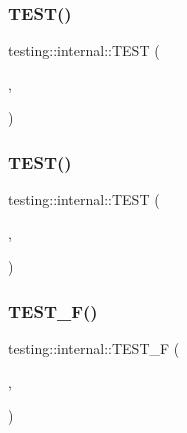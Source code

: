 \mbox{\label{namespacetesting_1_1internal_a0e7c2d58a313bec0821df19f44351d84}} 
\subsubsection{\texorpdfstring{TEST()}{TEST()}\hspace{0.1cm}{\footnotesize\ttfamily [40/41]}}
{\footnotesize\ttfamily testing\+::internal\+::\+T\+E\+ST (\begin{DoxyParamCaption}\item[{Thread\+Local\+Test}]{,  }\item[{Get\+And\+Pointer\+Return\+Same\+Value}]{ }\end{DoxyParamCaption})}

\mbox{\label{namespacetesting_1_1internal_aaed45d6ba960f02e8d3d042c606bc98e}} 
\subsubsection{\texorpdfstring{TEST()}{TEST()}\hspace{0.1cm}{\footnotesize\ttfamily [41/41]}}
{\footnotesize\ttfamily testing\+::internal\+::\+T\+E\+ST (\begin{DoxyParamCaption}\item[{Thread\+Local\+Test}]{,  }\item[{Pointer\+And\+Const\+Pointer\+Return\+Same\+Value}]{ }\end{DoxyParamCaption})}

\mbox{\label{namespacetesting_1_1internal_a7e113e9c70d45d89fe1703e58ff083b9}} 
\subsubsection{\texorpdfstring{TEST\_F()}{TEST\_F()}\hspace{0.1cm}{\footnotesize\ttfamily [1/2]}}
{\footnotesize\ttfamily testing\+::internal\+::\+T\+E\+S\+T\+\_\+F (\begin{DoxyParamCaption}\item[{\mbox{\hyperlink{classtesting_1_1internal_1_1ListenerTest}{Listener\+Test}}}]{,  }\item[{Does\+Foo}]{ }\end{DoxyParamCaption})}

